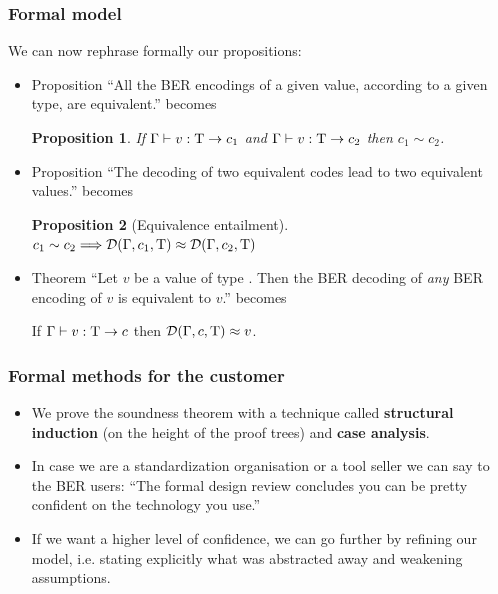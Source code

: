 \documentclass[compress,dvips,xcolor={dvipsnames},t]{beamer}
\newtheorem{proposition}{Proposition}
\newcommand{\coding}[4]{#1 \vdash #2 : #3 \rightarrow #4}
\newcommand{\decoding}[3]{{\cal D}(#1,#2,#3)}
\begin{document}
%
\begin{frame}
\frametitle{Formal model}

\vspace*{-5pt}

We can now rephrase formally our propositions:

\begin{itemize}

  \item Proposition ``All the BER encodings of a given value,
  according to a given type, are equivalent.'' becomes

  \begin{proposition}
    If $\coding{\Gamma}{v}{\T}{c_1}$ and $\coding{\Gamma}{v}{\T}{c_2}$
    then $c_1 \sim c_2$.
  \end{proposition}

  \item Proposition ``The decoding of two equivalent codes lead to two
  equivalent values.'' becomes

  \begin{proposition}[Equivalence entailment]
    $c_1 \sim c_2 \Longrightarrow \decoding{\Gamma}{c_1}{\T} \approx
    \decoding{\Gamma}{c_2}{\T}$
  \end{proposition}

  \item Theorem ``Let $v$ be a value of type \T. Then the BER decoding
  of \emph{any} BER encoding of $v$ is equivalent to $v$.'' becomes

  \begin{theorem}[Soundness]
    If $\coding{\Gamma}{v}{\T}{c}$ then $\decoding{\Gamma}{c}{\T}
    \approx v$.
  \end{theorem}

\end{itemize}

\end{frame}

%
\begin{frame}
\frametitle{Formal methods for the customer}

\begin{itemize}

  \item We prove the soundness theorem with a technique called
  \textbf{structural induction} (on the height of the proof trees) and
  \textbf{case analysis}.

  \item In case we are a standardization organisation or a tool seller
  we can say to the BER users: ``The formal design review concludes
  you can be pretty confident on the technology you use.''

  \item If we want a higher level of confidence, we can go further by
  refining our model, i.e. stating explicitly what was abstracted away
  and weakening assumptions.

\end{itemize}

\end{frame}
\end{document}
